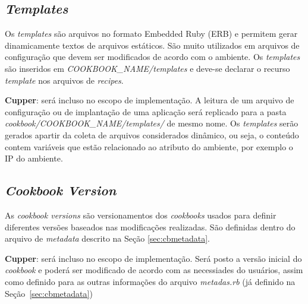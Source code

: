\subsection{\textit{Templates}}

Os \textit{templates} são arquivos no formato Embedded Ruby (ERB) e permitem gerar
dinamicamente textos de arquivos estáticos. São muito utilizados em arquivos
de configuração que devem ser modificados de acordo com o ambiente. Os
\textit{templates} são inseridos em \textit{COOKBOOK\_NAME/templates} e deve-se declarar o recurso
\textit{template} nos arquivos de \textit{recipes}.

\textbf{Cupper}: será incluso no escopo de implementação. A leitura de um arquivo de
configuração ou de implantação de uma aplicação será replicado para a
pasta \textit{cookbook/COOKBOOK\_NAME/templates/} de mesmo nome. Os \textit{templates} serão
gerados apartir da coleta de arquivos considerados din{\^a}mico, ou seja,
o conteúdo contem variáveis que estão relacionado ao atributo do ambiente,
por exemplo o IP do ambiente.

\subsection{\textit{Cookbook Version}}

As \textit{cookbook versions} são versionamentos dos \textit{cookbooks} usados para definir
diferentes versões baseados nas modificações realizadas. São definidas
  dentro do arquivo de \textit{metadata} descrito na Seção \ref{sec:cbmetadata}.

\textbf{Cupper}: será incluso no escopo de implementação. Será posto a versão inicial
do \textit{cookbook} e poderá ser modificado de acordo com as necessiades do usuários,
assim como definido para as outras informações do arquivo \textit{metadas.rb} (já definido
na Seção~\ref{sec:cbmetadata})

